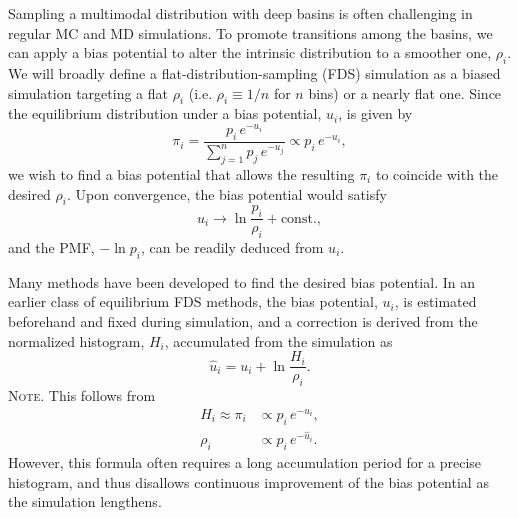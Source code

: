 \documentclass[preprint, superscriptaddress, floatfix]{revtex4-1}
\newcommand{\note}[1]{{\color{DarkGreen}\footnotesize \textsc{Note.} #1}}
\begin{document}
Sampling a multimodal distribution with deep basins
is often challenging in regular MC and MD simulations.
%
To promote transitions among the basins,
we can apply a bias potential to alter
the intrinsic distribution to a smoother one, $\rho_i$.
%
We will broadly define
a flat-distribution-sampling (FDS) simulation
as a biased simulation
targeting a flat $\rho_i$ (i.e. $\rho_i \equiv 1/n$ for $n$ bins)
or a nearly flat one\cite{
dayal2004, *trebst2004, barducci2008, singh2011}.
%
Since the equilibrium distribution
under a bias potential, $u_i$, is given by
%
\begin{equation}
  \pi_i
  =
  \frac{                p_i \, e^{-u_i} }
       { \sum_{j = 1}^n p_j \, e^{-u_j} }
  \propto
  p_i \, e^{-u_i}
  ,
  \label{eq:pi_p_V}
\end{equation}
%
we wish to find a bias potential that allows
the resulting $\pi_i$ to coincide
with the desired $\rho_i$.
%
Upon convergence, the bias potential would satisfy
%
\begin{equation}
  u_i \to \ln \frac{p_i}{\rho_i} + \mathrm{const.}
  ,
  \label{eq:Vi_target}
\end{equation}
%
and the PMF, $-\ln p_i$, can be readily
deduced from $u_i$.



Many methods\cite{mezei1987, berg1992, *lee1993,
wang2001, wang2001pre, huber1994,
*laio2002, *laio2008, *barducci2011, *sutto2012}
have been developed to find the desired bias potential.
%
In an earlier class of equilibrium FDS methods\cite{
  mezei1987, berg1992, *lee1993, marinari1992, *lyubartsev1992},
the bias potential, $u_i$, is
estimated beforehand and fixed
during simulation,
%
and a correction
is derived from the normalized histogram, $H_i$,
accumulated from the simulation as
%
\begin{equation}
  \hat u_i
  =
  u_i
  +
  \ln \frac{ H_i }
           { \rho_i }.
  \label{eq:vcorr_equil}
\end{equation}
%
\note{This follows from
  \begin{align*}
    H_i \approx \pi_i
    &\propto p_i \, e^{-u_i},
    \\
    \rho_i
    &\propto p_i \, e^{-\hat u_i}.
  \end{align*}
}
However, this formula often requires a long
accumulation period for a precise histogram,
and thus disallows
continuous improvement of the bias potential
as the simulation lengthens.
\end{document}

